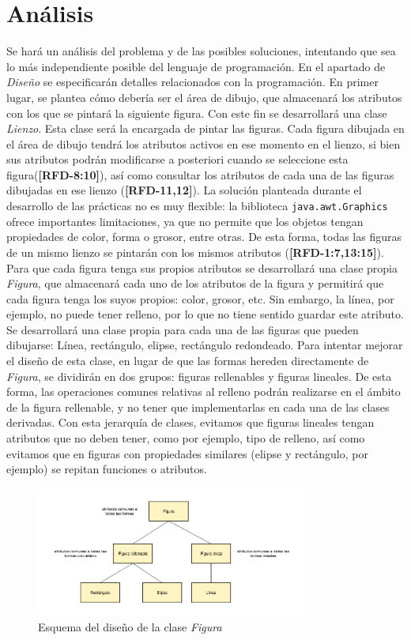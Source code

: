 \section{Análisis}
Se hará un análisis del problema y de las posibles soluciones, intentando que sea lo más independiente posible del lenguaje de programación. En el apartado de \textit{Diseño} se especificarán detalles relacionados con la programación.
\vskip0.3cm
En primer lugar, se plantea cómo debería ser el área de dibujo, que almacenará los atributos con los que se pintará la siguiente figura. Con este fin se desarrollará una clase \textit{Lienzo}. Esta clase será la encargada de pintar las figuras. Cada figura dibujada en el área de dibujo tendrá los atributos activos en ese momento en el lienzo, si bien sus atributos podrán modificarse a posteriori cuando se seleccione esta figura(\textbf{[RFD-8:10]}), así como consultar los atributos de cada una de las figuras dibujadas en ese lienzo (\textbf{[RFD-11,12]}).
\vskip0.3cm
La solución planteada durante el desarrollo de las prácticas no es muy flexible: la biblioteca \texttt{java.awt.Graphics} ofrece importantes limitaciones, ya que no permite que los objetos tengan propiedades de color, forma o grosor, entre otras. De esta forma, todas las figuras de un mismo lienzo se pintarán con los mismos atributos (\textbf{[RFD-1:7,13:15]}).
\vskip0.3cm
Para que cada figura tenga sus propios atributos se desarrollará una clase propia \textit{Figura}, que almacenará cada uno de los atributos de la figura y permitirá que cada figura tenga los suyos propios: color, grosor, etc. Sin embargo, la línea, por ejemplo, no puede tener relleno, por lo que no tiene sentido guardar este atributo. Se desarrollará una clase propia para cada una de las figuras que pueden dibujarse: Línea, rectángulo, elipse, rectángulo redondeado.
\vskip0.3cm
Para intentar mejorar el diseño de esta clase, en lugar de que las formas hereden directamente de \textit{Figura}, se dividirán en dos grupos: figuras rellenables y figuras lineales. De esta forma, las operaciones comunes relativas al relleno podrán realizarse en el ámbito de la figura rellenable, y no tener que implementarlas en cada una de las clases derivadas. Con esta jerarquía de clases, evitamos que figuras lineales tengan atributos que no deben tener, como por ejemplo, tipo de relleno, así como evitamos que en figuras con propiedades similares (elipse y rectángulo, por ejemplo) se repitan funciones o atributos.
\vskip0.3cm
\begin{figure}[H]
 \centering
  \includegraphics[width=0.8\textwidth]{esquemaFormas.png}
 \caption{Esquema del diseño de la clase \textit{Figura}}
 \label{diseño}
 \end{figure}
